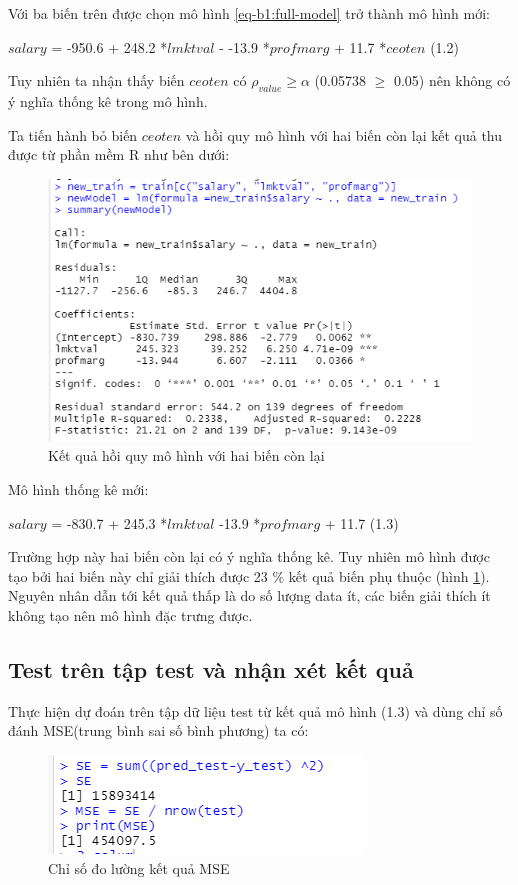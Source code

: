 Với ba biến trên được chọn mô hình \ref{eq-b1:full-model} trở thành mô hình mới:

$\textit{salary}$ = -950.6 + 248.2 *$\textit{lmktval}$ - -13.9 *$\textit{profmarg}$ + 11.7  *$\textit{ceoten}$  (1.2)

Tuy nhiên ta nhận thấy biến $\textit{ceoten}$ có $\rho_{value} \ge \alpha$ (0.05738 $\ge$ 0.05) nên không có ý nghĩa thống kê trong mô hình.

Ta tiến hành bỏ biến $\textit{ceoten}$ và hồi quy mô hình với hai biến còn lại kết quả thu được từ phần mềm R như bên dưới:

\begin{figure}[H]
	\centering
	\includegraphics[scale = 0.52]{../Photo Of Result/B1_newsummary.PNG}  
	\caption{Kết quả hồi quy mô hình với hai biến còn lại}
	\label{fig-b1:new-summary}
\end{figure}

Mô hình thống kê mới:

$\textit{salary}$ = -830.7 + 245.3 *$\textit{lmktval}$ -13.9 *$\textit{profmarg}$ + 11.7  (1.3)


Trường hợp này hai biến còn lại có ý nghĩa thống kê. Tuy nhiên mô hình được tạo bởi hai biến này chỉ giải thích được 23 $\%$ kết quả biến phụ thuộc (hình \ref{fig-b1:new-summary}). Nguyên nhân dẫn tới kết quả thấp là do số lượng data ít, các biến giải thích ít không tạo nên mô hình đặc trưng được.



\subsection*{Test trên tập test và nhận xét kết quả}

Thực hiện dự đoán trên tập dữ liệu test từ kết quả mô hình (1.3)  và dùng chỉ số đánh MSE(trung bình sai số bình phương) ta có:

\begin{figure}[H]
	\centering
	\includegraphics[scale = 0.5]{../Photo Of Result/B1_MSE.PNG}  
	\caption{Chỉ số đo lường kết quả MSE}
	\label{fig-b1:mse}
\end{figure}










